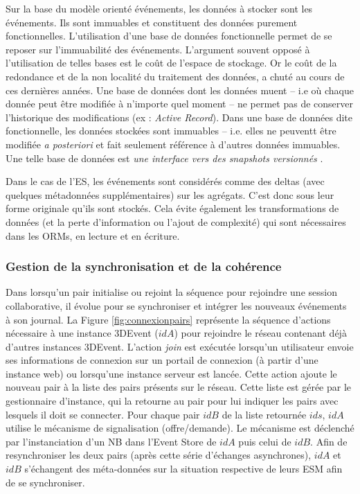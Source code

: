 Sur la base du modèle orienté événements, les données à stocker sont les 
événements. Ils sont immuables et 
constituent des données purement fonctionnelles.
L'utilisation d'une base de données fonctionnelle permet de se reposer sur 
l'immuabilité des événements.
L'argument souvent opposé à l'utilisation de telles bases est le coût de l'espace de 
stockage. Or le coût de la redondance et de la non localité du traitement des 
données, a chuté au cours de ces dernières années. 
Une base de données dont les données muent -- i.e où chaque donnée peut être 
modifiée à n'importe quel moment -- ne permet pas de conserver l'historique des 
modifications (ex : \textit{Active Record}). Dans une base de données dite 
fonctionnelle, les données stockées sont immuables -- i.e. elles ne peuventt être modifiée \textit{a posteriori} et fait seulement référence à 
d'autres données immuables. Une telle base de données est \og \textit{une interface vers 
des \textit{snapshots} versionnés}\fg{} \cite{Meric2012}.

Dans le cas de l'\gls{ES}, les événements sont considérés comme des deltas 
(avec quelques métadonnées supplémentaires) sur les agrégats. C'est donc sous 
leur forme originale qu'ils sont stockés. Cela évite également les transformations 
de données (et la perte d'information ou l'ajout de complexité) qui sont nécessaires 
dans les \glspl{ORM}, en lecture et en écriture.

\subsubsection{Gestion de la synchronisation et de la cohérence}
Dans \cite{Desprat2017} lorsqu'un pair initialise ou rejoint la séquence pour 
rejoindre une session collaborative, il évolue pour se synchroniser et intégrer les 
nouveaux événements à son journal.
La Figure \ref{fig:connexionpairs} représente la séquence d'actions nécessaire à 
une instance 3DEvent ($idA$) pour rejoindre le réseau contenant déjà d'autres 
instances 3DEvent. L'action \textit{join} est exécutée lorsqu'un utilisateur envoie 
ses informations de connexion sur un portail de connexion (à partir d'une instance 
web) ou lorsqu'une instance serveur est lancée. Cette action ajoute le nouveau 
pair à la liste des pairs présents sur le réseau. Cette liste est gérée par le 
gestionnaire d'instance, qui la retourne au pair pour lui indiquer les pairs 
avec lesquels il doit se connecter.
Pour chaque pair $idB$ de la liste retournée $ids$, $idA$ utilise le mécanisme de 
signalisation (offre/demande). Le mécanisme est déclenché par l'instanciation d'un 
\gls{NB} dans l'Event Store de $idA$ puis celui de $idB$. Afin de resynchroniser 
les deux pairs (après cette série d'échanges asynchrones), $idA$ et $idB$ 
s'échangent des méta-données sur la situation respective de leurs \gls{ESM} 
afin de se synchroniser.

